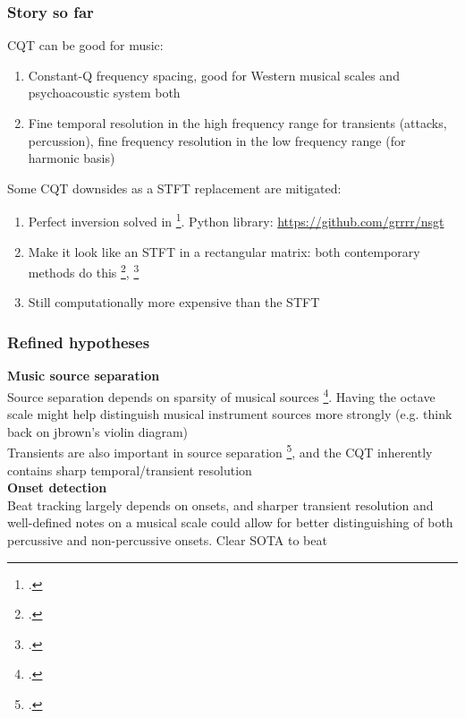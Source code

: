 \documentclass[usenames,dvipsnames]{beamer}
\begin{document}
\begin{frame}
	\frametitle{Story so far}
	CQT can be good for music:
	\begin{enumerate}
		\item
			Constant-Q frequency spacing, good for Western musical scales and psychoacoustic system both
		\item
			Fine temporal resolution in the high frequency range for transients (attacks, percussion), fine frequency resolution in the low frequency range (for harmonic basis)
	\end{enumerate}
	Some CQT downsides as a STFT replacement are mitigated:
	\begin{enumerate}
		\item
			Perfect inversion solved in \footcite{invertiblecqt}. Python library: \href{https://github.com/grrrr/nsgt}{https://github.com/grrrr/nsgt}
		\item
			Make it look like an STFT in a rectangular matrix: both contemporary methods do this \footcite{cqtklapuri}, \footcite{invertiblecqt}
		\item
			Still computationally more expensive than the STFT
	\end{enumerate}
\end{frame}

\begin{frame}
	\frametitle{Refined hypotheses}
	\textbf{Music source separation}\\
	Source separation depends on sparsity of musical sources \footcite{musicsepgood}. Having the octave scale might help distinguish musical instrument sources more strongly (e.g. think back on jbrown's violin diagram)\\
	Transients are also important in source separation \footcite{transientsep}, and the CQT inherently contains sharp temporal/transient resolution\\
	\vspace{1em}
	\textbf{Onset detection}\\
	Beat tracking largely depends on onsets, and sharper transient resolution and well-defined notes on a musical scale could allow for better distinguishing of both percussive and non-percussive onsets. Clear SOTA to beat
\end{frame}
\end{document}
